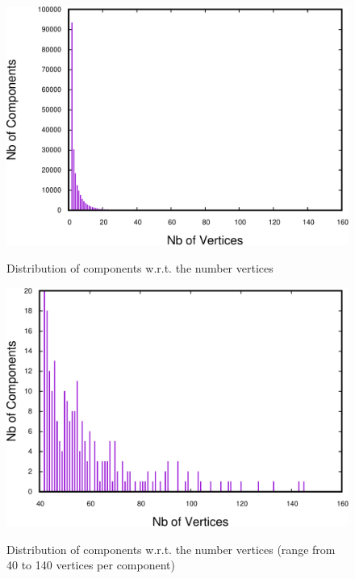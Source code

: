 \begin{figure}
\centering
\includegraphics[scale=0.35]{bench/frequencyall-crop.pdf}
\label{fig:vertices-components-all}
\caption{Distribution of components w.r.t. the number vertices}
\end{figure}

\begin{figure}
\centering
\includegraphics[scale=0.35]{bench/frequency-selected-crop.pdf}
\label{fig:vertices-components-all}
\caption{Distribution of components w.r.t. the number vertices (range from 40 to 140 vertices per component)}
\end{figure}


